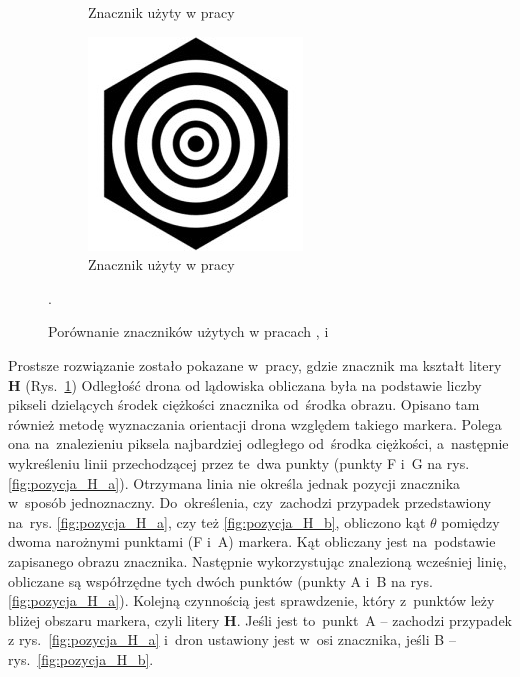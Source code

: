 \begin{figure}
\begin{subfigure}{0.3\textwidth}
		\caption{Znacznik użyty w pracy \cite{H}}
		\label{fig:znacznik_H}
		\end{subfigure}
		\begin{subfigure}{0.3\textwidth}
		\centering
		\includegraphics[width=\textwidth]{znacznik_rings.jpg}
		\caption{Znacznik użyty w pracy \cite{Rings}}
		\label{fig:znacznik_rings}
		\end{subfigure}
	\caption{Porównanie znaczników użytych w pracach \cite{Rings},\cite{Falanga} i \cite{H}}.
	\label{fig:Znaczniki}
\end{figure}


Prostsze rozwiązanie zostało pokazane w~pracy\cite{H}, gdzie znacznik ma kształt litery \textbf{H} (Rys.~\ref{fig:znacznik_H}) 
Odległość drona od lądowiska obliczana była na podstawie liczby pikseli dzielących środek ciężkości znacznika od~środka obrazu. 
Opisano tam również metodę wyznaczania orientacji drona względem takiego markera. 
Polega ona na~znalezieniu piksela najbardziej odległego od~środka ciężkości, a~następnie wykreśleniu linii przechodzącej przez te~dwa punkty (punkty F i~G na rys. \ref{fig:pozycja_H_a}). 
Otrzymana linia nie określa jednak pozycji znacznika w~sposób jednoznaczny.
Do~określenia, czy~zachodzi przypadek przedstawiony na~rys. \ref{fig:pozycja_H_a}, czy też \ref{fig:pozycja_H_b}, obliczono kąt $\theta$ pomiędzy dwoma narożnymi punktami (F i~A) markera.
Kąt obliczany jest na~podstawie zapisanego obrazu znacznika. 
Następnie wykorzystując znalezioną wcześniej linię, obliczane są współrzędne tych dwóch punktów (punkty A i~B na rys. \ref{fig:pozycja_H_a}). 
Kolejną czynnością jest sprawdzenie, który z~punktów leży bliżej obszaru markera, czyli litery \textbf{H}. 
Jeśli jest to~punkt~A -- zachodzi przypadek z rys.~\ref{fig:pozycja_H_a} i~dron ustawiony jest w~osi znacznika, jeśli B --rys.~\ref{fig:pozycja_H_b}.

